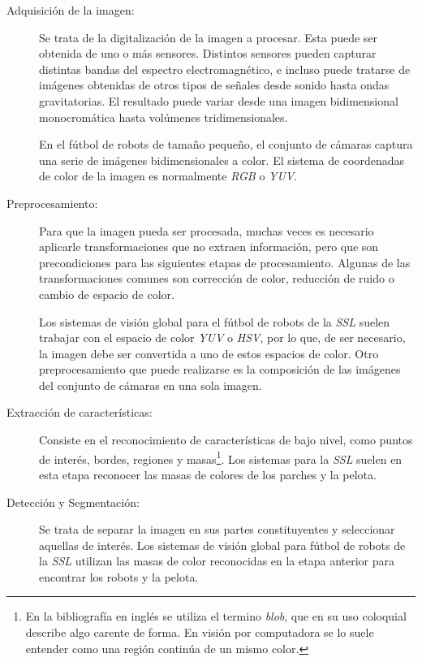 \begin{description}

	\item[Adquisición de la imagen:] Se trata de la digitalización de la
		imagen a procesar. Esta puede ser obtenida de uno o más
		sensores. Distintos sensores pueden capturar distintas bandas
		del espectro electromagnético, e incluso puede tratarse de
		imágenes obtenidas de otros tipos de señales desde sonido
		hasta ondas gravitatorias. El resultado puede variar desde una
		imagen bidimensional monocromática hasta volúmenes
		tridimensionales.

		En el fútbol de robots de tamaño pequeño, el conjunto de cámaras
		captura una serie de imágenes bidimensionales a color. El
		sistema de coordenadas de color de la imagen es normalmente
		\emph{RGB} o \emph{YUV}.

	\item[Preprocesamiento:] Para que la imagen pueda ser procesada, muchas
		veces es necesario aplicarle transformaciones que no extraen
		información, pero que son precondiciones para las siguientes
		etapas de procesamiento. Algunas de las transformaciones comunes
		son corrección de color, reducción de ruido o cambio de espacio
		de color.

		Los sistemas de visión global para el fútbol de robots de la
		\emph{SSL} suelen trabajar con el espacio de color \emph{YUV}
		o \emph{HSV}, por lo que, de ser necesario, la imagen debe ser
		convertida a uno de estos espacios de color. Otro
		preprocesamiento que puede realizarse es la composición de las
		imágenes del conjunto de cámaras en una sola imagen.

	\item[Extracción de características:] Consiste en el reconocimiento de
		características de bajo nivel, como puntos de interés, bordes,
		regiones y masas\footnote{En la bibliografía en inglés se
		utiliza el termino \emph{blob}, que en su uso coloquial
		describe algo carente de forma. En visión por computadora se
		lo suele entender como una región continúa de un mismo
		color.}. Los sistemas para la \emph{SSL} suelen en esta etapa
		reconocer las masas de colores de los parches y la pelota.

	\item[Detección y Segmentación:] Se trata de separar la imagen en sus
		partes constituyentes y seleccionar aquellas de interés. Los
		sistemas de visión global para fútbol de robots de la \emph{SSL}
		utilizan las masas de color reconocidas en la etapa anterior
		para encontrar los robots y la pelota.


\end{description}

